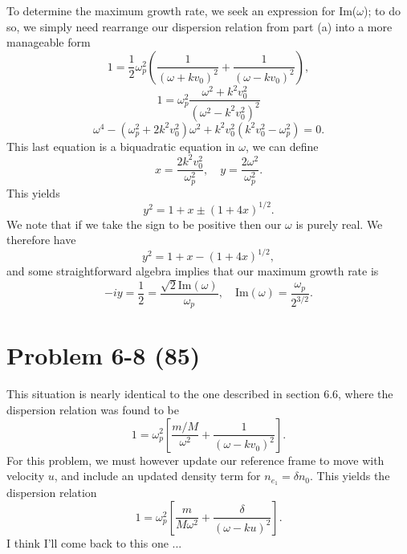 To determine the maximum growth rate, we seek an expression for Im(\(\omega\)); to do so, we simply need rearrange our dispersion relation from part (a) into a more manageable form
\begin{equation*}
	1 = \dfrac{1}{2}\omega_p^2\left(\dfrac{1}{(\omega + kv_0)^2} + \dfrac{1}{(\omega - kv_0)^2}\right),
\end{equation*}
\begin{equation*}
	1 = \omega_p^2\dfrac{\omega^2 + k^2v_0^2}{(\omega^2 - k^2v_0^2)^2}
\end{equation*}
\begin{equation*}
	\omega^4 - (\omega_p^2 + 2k^2v_0^2)\omega^2 + k^2v_0^2(k^2v_0^2 - \omega_p^2) = 0.
\end{equation*}
This last equation is a biquadratic equation in \(\omega\), we can define
\begin{equation*}
	x = \dfrac{2k^2v_0^2}{\omega_p^2}, \quad y = \dfrac{2\omega^2}{\omega_p^2}.
\end{equation*}
This yields
\begin{equation*}
	y^2 = 1 + x \pm (1 + 4x)^{1/2}.
\end{equation*}
We note that if we take the sign to be positive then our \(\omega \) is purely real. We therefore have
\begin{equation*}
	y^2 = 1 + x - (1 + 4x)^{1/2},
\end{equation*}
and some straightforward algebra implies that our maximum growth rate is
\begin{equation*}
	-iy = \dfrac{1}{2} = \dfrac{\sqrt{2}\text{Im}(\omega)}{\omega_p}, \quad \text{Im}(\omega) = \dfrac{\omega_p}{2^{3/2}}.
\end{equation*}

\section*{Problem 6-8 (85)}
\label{sec:6-8}
This situation is nearly identical to the one described in section 6.6, where the dispersion relation was found to be
\begin{equation*}
	1 = \omega_p^2\left[\dfrac{m/M}{\omega^2} + \dfrac{1}{(\omega - kv_0)^2}\right].
\end{equation*}
For this problem, we must however update our reference frame to  move with velocity \(u\), and include an updated density term for \(n_{e_1} = \delta n_0\). This yields the dispersion relation
\begin{equation*}
	1 = \omega_p^2\left[\dfrac{m}{M\omega^2} + \dfrac{\delta}{(\omega - ku)^2}\right].
\end{equation*}
I think I'll come back to this one ...


















